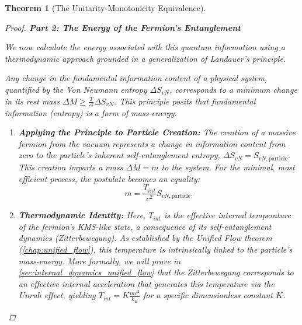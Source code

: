 \documentclass[11pt, letterpaper]{report}
\theoremstyle{plain} %
\newtheorem{theorem}{Theorem}[chapter]
\theoremstyle{definition} %
\theoremstyle{remark} %
\begin{document}
\begin{theorem}[The Unitarity-Monotonicity Equivalence]
\begin{proof}
\textbf{Part 2: The Energy of the Fermion's Entanglement}

We now calculate the energy associated with this quantum information using a thermodynamic approach grounded in a generalization of Landauer's principle.

\begin{postulate}
\label{post:relativistic_landauer_entropy_form_final}
Any change in the fundamental information content of a physical system, quantified by the Von Neumann entropy $\Delta S_{vN}$, corresponds to a minimum change in its rest mass $\Delta M \ge \frac{T}{c^2} \Delta S_{vN}$. This principle posits that fundamental information (entropy) is a form of mass-energy.
\end{postulate}
\begin{enumerate}
    \item \textbf{Applying the Principle to Particle Creation:} The creation of a massive fermion from the vacuum represents a change in information content from zero to the particle's inherent self-entanglement entropy, $\Delta S_{vN} = S_{vN, \text{particle}}$. This creation imparts a mass $\Delta M = m$ to the system. For the minimal, most efficient process, the postulate becomes an equality:
    \begin{equation}
        m = \frac{T_{int}}{c^2} S_{vN, \text{particle}}.
        \label{eq:mass_from_landauer}
    \end{equation}

    \item \textbf{Thermodynamic Identity:} Here, $T_{int}$ is the effective internal temperature of the fermion's KMS-like state, a consequence of its self-entanglement dynamics (Zitterbewegung). As established by the Unified Flow theorem (\cref{chap:unified_flow}), this temperature is intrinsically linked to the particle's mass-energy. More formally, we will prove in \cref{sec:internal_dynamics_unified_flow} that the Zitterbewegung corresponds to an effective internal acceleration that generates this temperature via the Unruh effect, yielding $T_{int} = K \frac{mc^2}{k_B}$ for a specific dimensionless constant $K$.


\end{enumerate}
\end{proof}
\end{theorem}
\end{document}
